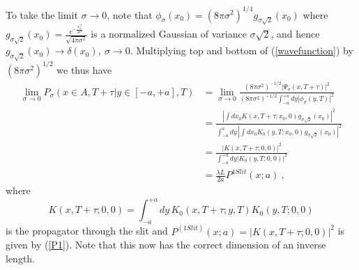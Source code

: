 \documentclass[12pt,aps,prb,preprint]{revtex4-1}   %
\begin{document}
To take the limit $\sigma \to 0$, note that $\phi_\sigma(x_0) =
(8\pi\sigma^2)^{1/4}g_{\sigma\sqrt{2}}(x_0)$ where
$g_{\sigma\sqrt{2}}(x_0)=\frac{e^{-\frac{x_0^{'2}}{4\sigma^2}}}{\sqrt{4\pi\sigma^2}}$
is a normalized Gaussian of variance $\sigma\sqrt{2}$, and hence
$g_{\sigma\sqrt{2}}(x_0) \rightarrow \delta(x_0),\
\sigma\rightarrow0$. Multiplying top and bottom of
(\ref{wavefunction}) by $(8\pi \sigma^2)^{1/2}$ we thus have
\begin{align}
\lim_{\sigma\rightarrow 0}P_\sigma\left(x\in A,T+\tau|y\in
[-a,+a],T\right) &= \lim_{\sigma\rightarrow 0}
\frac{(8\pi\sigma^2)^{-1/2}
|\Psi_\sigma(x,T+\tau)|^2}{(8\pi\sigma^2)^{-1/2}\int_{-a}^{+a}dy
|\phi_\sigma(y,T)|^2} {}\nonumber\\ &= \frac{\left| \int dx_0
K(x,T+\tau; x_0,0) g_{\sigma \sqrt{2}}(x_0) \right|^2}{\int_{-a}^a
dy\, \left| \int dx_0 K_0(y,T;x_0,0) g_{\sigma \sqrt{2}} (x_0)
\right|^2} {}\nonumber\\ &= \frac{
|K(x,T+\tau;0,0)|^2}{\int_{-a}^{+a} dy |K_0(y,T;0,0)|^2}
{}\nonumber\\{}&=\frac{\lambda L}{2a}  P^{1 Slit}(x;a)\ ,
\end{align}
where \begin{equation} \label{propagator} K(x,T+\tau;0,0) =
\int_{-a}^{+a} dy\, K_0(x,T+\tau;y,T) K_0(y,T;0,0) \end{equation}
is the propagator through the slit and $P^{(1 Slit)}(x;a) =
|K(x,T+\tau;0,0)|^2$ is given by (\ref{P1}). Note that this now
has the correct dimension of an inverse length.
\end{document}
